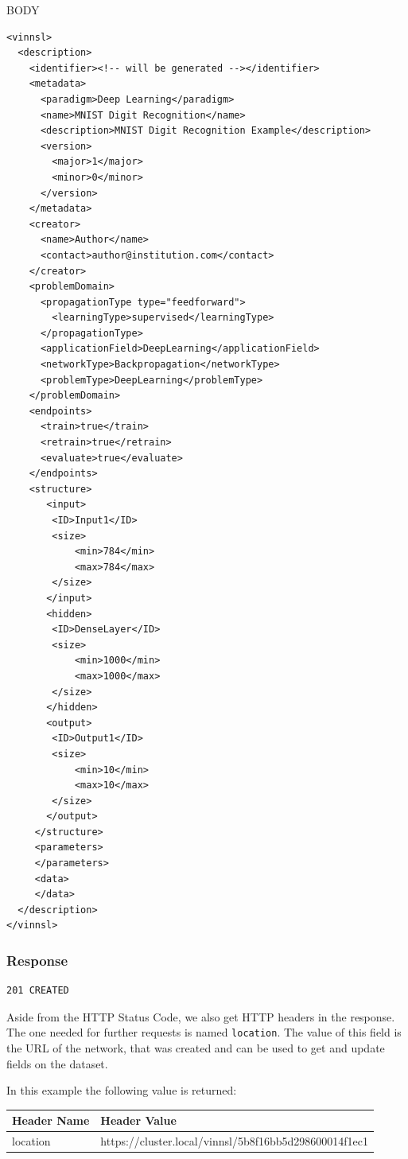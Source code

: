 BODY

\begin{verbatim}
<vinnsl>
  <description>
    <identifier><!-- will be generated --></identifier>
    <metadata>
      <paradigm>Deep Learning</paradigm>
      <name>MNIST Digit Recognition</name>
      <description>MNIST Digit Recognition Example</description>
      <version>
        <major>1</major>
        <minor>0</minor>
      </version>
    </metadata>
    <creator>
      <name>Author</name>
      <contact>author@institution.com</contact>
    </creator>
    <problemDomain>
      <propagationType type="feedforward">
        <learningType>supervised</learningType>
      </propagationType>
      <applicationField>DeepLearning</applicationField>
      <networkType>Backpropagation</networkType>
      <problemType>DeepLearning</problemType>
    </problemDomain>
    <endpoints>
      <train>true</train>
      <retrain>true</retrain>
      <evaluate>true</evaluate>
    </endpoints>
    <structure>
       <input>
        <ID>Input1</ID>
        <size>
            <min>784</min>
            <max>784</max>
        </size>
       </input>
       <hidden>
        <ID>DenseLayer</ID>
        <size>
            <min>1000</min>
            <max>1000</max>
        </size>
       </hidden>
       <output>
        <ID>Output1</ID>
        <size>
            <min>10</min>
            <max>10</max>
        </size>
       </output>
     </structure>
     <parameters>
     </parameters>
     <data>
     </data>
  </description>
</vinnsl>
\end{verbatim}

\subsubsection{Response}\label{response-6}

\begin{verbatim}
201 CREATED 
\end{verbatim}

Aside from the HTTP Status Code, we also get HTTP headers in the
response. The one needed for further requests is named
\texttt{location}. The value of this field is the URL of the network,
that was created and can be used to get and update fields on the
dataset.

In this example the following value is returned:

\begin{longtable}[]{@{}ll@{}}
\toprule
Header Name & Header Value\tabularnewline
\midrule
\endhead
location &
https://cluster.local/vinnsl/5b8f16bb5d298600014f1ec1\tabularnewline
\bottomrule
\end{longtable}

